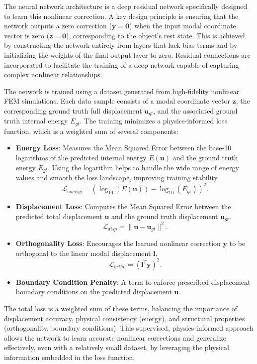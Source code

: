 \documentclass[11pt,a4paper,twocolumn]{article}
\begin{document}
The neural network architecture is a deep residual network specifically designed to learn this nonlinear correction. A key design principle is ensuring that the network outputs a zero correction ($\bm{y}=\bm{0}$) when the input modal coordinate vector is zero ($\bm{z}=\bm{0}$), corresponding to the object's rest state. This is achieved by constructing the network entirely from layers that lack bias terms and by initializing the weights of the final output layer to zero. Residual connections are incorporated to facilitate the training of a deep network capable of capturing complex nonlinear relationships.

The network is trained using a dataset generated from high-fidelity nonlinear FEM simulations. Each data sample consists of a modal coordinate vector $\bm{z}$, the corresponding ground truth full displacement $\bm{u}_{gt}$, and the associated ground truth internal energy $E_{gt}$. The training minimizes a physics-informed loss function, which is a weighted sum of several components:
\begin{itemize}
    \item \textbf{Energy Loss}: Measures the Mean Squared Error between the base-10 logarithms of the predicted internal energy $E(\bm{u})$ and the ground truth energy $E_{gt}$. Using the logarithm helps to handle the wide range of energy values and smooth the loss landscape, improving training stability.
    \begin{equation}
        \mathcal{L}_{energy} = (\log_{10}(E(\bm{u})) - \log_{10}(E_{gt}))^2.
    \end{equation}
    \item \textbf{Displacement Loss}: Computes the Mean Squared Error between the predicted total displacement $\bm{u}$ and the ground truth displacement $\bm{u}_{gt}$.
    \begin{equation}
        \mathcal{L}_{disp} = \|\bm{u} - \bm{u}_{gt}\|^2.
    \end{equation}
    \item \textbf{Orthogonality Loss}: Encourages the learned nonlinear correction $\bm{y}$ to be orthogonal to the linear modal displacement $\bm{l}$.
    \begin{equation}
        \mathcal{L}_{ortho} = (\bm{l}^T \bm{y})^2.
    \end{equation}
    \item \textbf{Boundary Condition Penalty}: A term to enforce prescribed displacement boundary conditions on the predicted displacement $\bm{u}$.
\end{itemize}
The total loss is a weighted sum of these terms, balancing the importance of displacement accuracy, physical consistency (energy), and structural properties (orthogonality, boundary conditions). This supervised, physics-informed approach allows the network to learn accurate nonlinear corrections and generalize effectively, even with a relatively small dataset, by leveraging the physical information embedded in the loss function.
\end{document}

